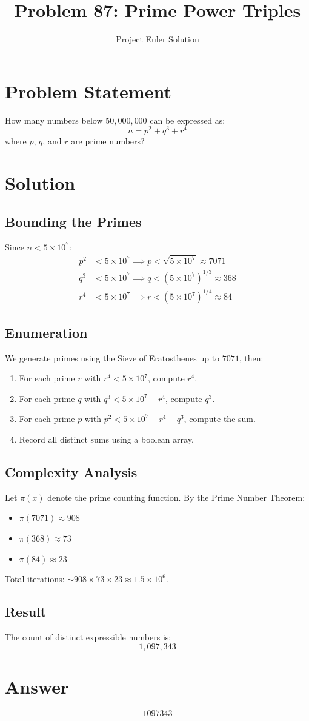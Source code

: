 \documentclass[12pt,a4paper]{article}
\title{Problem 87: Prime Power Triples}
\author{Project Euler Solution}
\date{}
\begin{document}
\maketitle

\section{Problem Statement}
How many numbers below $50{,}000{,}000$ can be expressed as:
\[
n = p^2 + q^3 + r^4
\]
where $p$, $q$, and $r$ are prime numbers?

\section{Solution}

\subsection{Bounding the Primes}
Since $n < 5 \times 10^7$:
\begin{align}
p^2 &< 5 \times 10^7 \implies p < \sqrt{5 \times 10^7} \approx 7071 \\
q^3 &< 5 \times 10^7 \implies q < (5 \times 10^7)^{1/3} \approx 368 \\
r^4 &< 5 \times 10^7 \implies r < (5 \times 10^7)^{1/4} \approx 84
\end{align}

\subsection{Enumeration}
We generate primes using the Sieve of Eratosthenes up to $7071$, then:
\begin{enumerate}
\item For each prime $r$ with $r^4 < 5 \times 10^7$, compute $r^4$.
\item For each prime $q$ with $q^3 < 5 \times 10^7 - r^4$, compute $q^3$.
\item For each prime $p$ with $p^2 < 5 \times 10^7 - r^4 - q^3$, compute the sum.
\item Record all distinct sums using a boolean array.
\end{enumerate}

\subsection{Complexity Analysis}
Let $\pi(x)$ denote the prime counting function. By the Prime Number Theorem:
\begin{itemize}
\item $\pi(7071) \approx 908$
\item $\pi(368) \approx 73$
\item $\pi(84) \approx 23$
\end{itemize}

Total iterations: $\sim 908 \times 73 \times 23 \approx 1.5 \times 10^6$.

\subsection{Result}
The count of distinct expressible numbers is:
\[
\boxed{1{,}097{,}343}
\]

\section{Answer}

\[
\boxed{1097343}
\]
\end{document}
